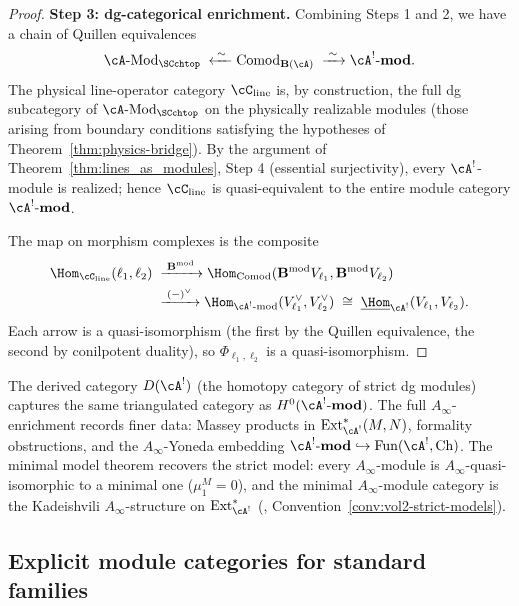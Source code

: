 \begin{proof}
\textbf{Step 3: dg-categorical enrichment.}
Combining Steps 1 and 2, we have a chain of Quillen
equivalences
\[
\cA\text{-}\mathrm{Mod}_{\SCchtop}
\;\xleftarrow{\;\sim\;}
\mathrm{Comod}_{\mathbf{B}(\cA)}
\;\xrightarrow{\;\sim\;}
\cA^!\text{-}\mathbf{mod}.
\]
The physical line-operator category $\cC_{\mathrm{line}}$
is, by construction, the full dg subcategory of
$\cA\text{-}\mathrm{Mod}_{\SCchtop}$ on the physically
realizable modules (those arising from boundary conditions
satisfying the hypotheses of Theorem~\ref{thm:physics-bridge}). By the argument of
Theorem~\ref{thm:lines_as_modules}, Step 4 (essential
surjectivity), every $\cA^!$-module is realized; hence
$\cC_{\mathrm{line}}$ is quasi-equivalent to the entire
module category $\cA^!\text{-}\mathbf{mod}$.

The map on morphism complexes is the composite
\begin{align*}
\Hom_{\cC_{\mathrm{line}}}(\ell_1,\ell_2)
&\;\xrightarrow{\;\mathbf{B}^{\mathrm{mod}}\;}
\Hom_{\mathrm{Comod}}(\mathbf{B}^{\mathrm{mod}}V_{\ell_1},
\mathbf{B}^{\mathrm{mod}}V_{\ell_2}) \\
&\;\xrightarrow{\;(-)^\vee\;}
\Hom_{\cA^!\text{-mod}}(V_{\ell_1}^\vee,V_{\ell_2}^\vee)
\;\cong\;
\underline{\Hom}_{\cA^!}(V_{\ell_1},V_{\ell_2}).
\end{align*}
Each arrow is a quasi-isomorphism (the first by the
Quillen equivalence, the second by conilpotent duality),
so $\Phi_{\ell_1,\ell_2}$ is a quasi-isomorphism.
\end{proof}

\begin{remark}
The derived category $D(\cA^!)$ (the homotopy category
of strict dg modules) captures the same triangulated
category as $H^0(\cA^!\text{-}\mathbf{mod})$. The
full $A_\infty$-enrichment records finer data:
Massey products in $\operatorname{Ext}^*_{\cA^!}(M,N)$,
formality obstructions, and
the $A_\infty$-Yoneda embedding
$\cA^!\text{-}\mathbf{mod}\hookrightarrow
\mathrm{Fun}(\cA^!,\mathrm{Ch})$. The minimal model theorem
recovers the strict model: every
$A_\infty$-module is $A_\infty$-quasi-isomorphic to a
minimal one ($\mu_1^M=0$), and the minimal
$A_\infty$-module category is the Kadeishvili
$A_\infty$-structure on $\operatorname{Ext}^*_{\cA^!}$
(\cite{Kad82}, Convention~\ref{conv:vol2-strict-models}).
\end{remark}

\subsection{Explicit module categories for standard families}

